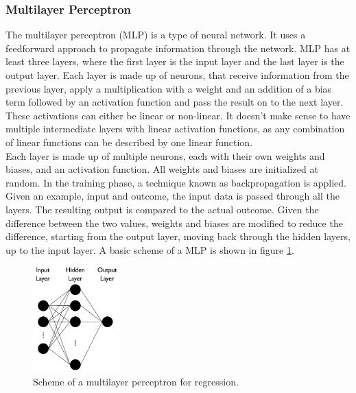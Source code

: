 \subsubsection{Multilayer Perceptron}
The multilayer perceptron (MLP) is a type of neural network. It uses a feedforward approach to propagate information through the network. MLP has at least three layers, where the first layer is the input layer and the last layer is the output layer. Each layer is made up of neurons, that receive information from the previous layer, apply a multiplication with a weight and an addition of a bias term followed by an activation function and pass the result on to the next layer. These activations can either be linear or non-linear. It doesn't make sense to have multiple intermediate layers with linear activation functions, as any combination of linear functions can be described by one linear function. \\
Each layer is made up of multiple neurons, each with their own weights and biases, and an activation function. All weights and biases are initialized at random. In the training phase, a technique known as backpropagation is applied. Given an example, input and outcome, the input data is passed through all the layers. The resulting output is compared to the actual outcome. Given the difference between the two values, weights and biases are modified to reduce the difference, starting from the output layer, moving back through the hidden layers, up to the input layer. A basic scheme of a MLP is shown in figure \ref{fig:mlpdiag}.

\begin{figure}[h]
\centering
\includegraphics[width=0.3\textwidth]{figures/mlpdiag}
\caption{Scheme of a multilayer perceptron for regression.}
\label{fig:mlpdiag}
\end{figure}


